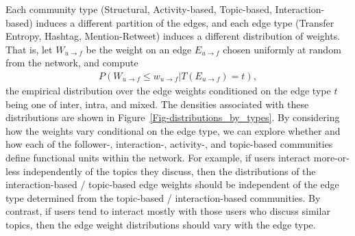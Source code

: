 
Each community type (Structural, Activity-based, Topic-based, Interaction-based) induces a different partition of the edges, and each edge type (Transfer Entropy, Hashtag, Mention-Retweet) induces a different distribution of weights. That is, let $W_{u \to f}$ be the weight on an edge $E_{u \to f}$ chosen uniformly at random from the network, and compute
\begin{align}
	P(W_{u \to f} \leq w_{u \to f} | T(E_{u \to f}) = t),
\end{align}
the empirical distribution over the edge weights conditioned on the edge type $t$ being one of inter, intra, and mixed. The densities associated with these distributions are shown in Figure~\ref{Fig-distributions_by_types}. By considering how the weights vary conditional on the edge type, we can explore whether and how each of the follower-, interaction-, activity-, and topic-based communities define functional units within the network. For example, if users interact more-or-less independently of the topics they discuss, then the distributions of the interaction-based / topic-based edge weights should be independent of the edge type determined from the topic-based / interaction-based communities. By contrast, if users tend to interact mostly with those users who discuss similar topics, then the edge weight distributions should vary with the edge type.
